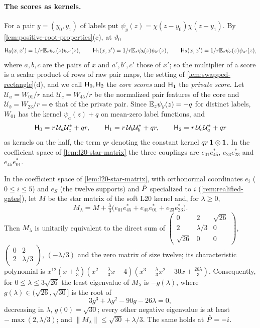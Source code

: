\paragraph{The scores as kernels.}
For a pair $y=(y_0,y_1)$ of labels put $\psi_y(z)=\chi(z-y_0)\chi(z-y_1)$. By
\cref{lem:positive-root-properties}(c), at $\vartheta_0$
\[
 \mathsf H_{0}(x,x')=1/r\mathbb E_z\psi_a(z)\psi_{c'}(z),\qquad
 \mathsf H_{1}(x,x')=1/r\mathbb E_z\psi_b(z)\psi_{b'}(z),\qquad
 \mathsf H_{2}(x,x')=1/r\mathbb E_z\psi_c(z)\psi_{a'}(z),
\]
where $a,b,c$ are the pairs of $x$ and $a',b',c'$ those of $x'$; so the multiplier of a
score is a scalar product of rows of raw pair maps, the setting of
\cref{lem:swapped-rectangle}(d), and we call $\mathsf H_{0},\mathsf H_{2}$ the \emph{core scores} and $\mathsf H_{1}$
the \emph{private score}. Let $\mathcal U_a=W_{01}/r$ and $\mathcal U_c=W_{45}/r$ be the
normalized pair features of the core and $\mathcal U_b=W_{23}/r=\mathbf e$ that of the
private pair. Since $\mathbb E_z\psi_y(z)=-q$ for distinct labels, $W_{01}$ has the kernel
$\psi_a(z)+q$ on mean-zero label functions, and
\begin{equation}\label{eq:root-score-feature}
 \mathsf H_{0}=r\,\mathcal U_a\mathcal U_c^*+qr,\qquad
 \mathsf H_{1}=r\,\mathcal U_b\mathcal U_b^*+qr,\qquad
 \mathsf H_{2}=r\,\mathcal U_c\mathcal U_a^*+qr
\end{equation}
as kernels on the half, the term $qr$ denoting the constant kernel
$qr\,\mathbf 1\otimes\mathbf 1$. In the coefficient space of \cref{lem:l20-star-matrix} the three couplings
are $e_{01}e_{45}^*$, $e_{23}e_{23}^*$ and $e_{45}e_{01}^*$.

\begin{lemma}\label{lem:root-pair-matrix}
In the coefficient space of \cref{lem:l20-star-matrix}, with orthonormal coordinates $e_i$
($0\le i\le5$) and $e_S$ (the twelve supports) and $\hat P$ specialized to $i$
(\cref{rem:realified-gates}), let $M$ be the star matrix of the soft L20 kernel and, for
$\lambda\ge0$,
\[
 M_\lambda=M+\tfrac\lambda3\bigl(e_{01}e_{45}^*+e_{45}e_{01}^*+e_{23}e_{23}^*\bigr).
\]
Then $M_\lambda$ is unitarily equivalent to the direct sum of
$\left(\begin{smallmatrix}0&2&\sqrt{26}\\2&\lambda/3&0\\\sqrt{26}&0&0\end{smallmatrix}\right)$,
$\left(\begin{smallmatrix}0&2\\2&\lambda/3\end{smallmatrix}\right)$, $(-\lambda/3)$ and the
zero matrix of size twelve; its characteristic polynomial is
$x^{12}(x+\frac\lambda3)(x^2-\frac\lambda3x-4)(x^3-\frac\lambda3x^2-30x+\frac{26\lambda}3)$.
Consequently, for $0\le\lambda\le3\sqrt{26}$ the least eigenvalue of $M_\lambda$ is
$-g(\lambda)$, where $g(\lambda)\in(\sqrt{26},\sqrt{30}]$ is the root of
\begin{equation}\label{eq:root-cubic}
 3g^3+\lambda g^2-90g-26\lambda=0 ,
\end{equation}
decreasing in $\lambda$, $g(0)=\sqrt{30}$; every other negative eigenvalue is at least
$-\max(2,\lambda/3)$; and $\|M_\lambda\|\le\sqrt{30}+\lambda/3$. The same holds at
$\hat P=-i$.
\end{lemma}

